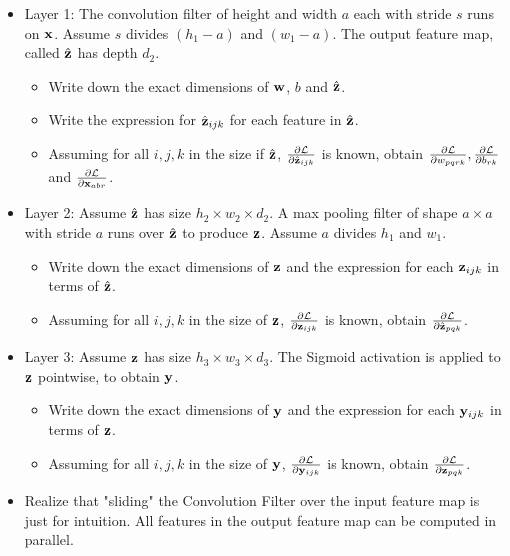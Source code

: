 \begin{itemize}
    \item 
Layer 1:
The convolution filter of height and width $a$ each with stride $s$ runs on $\mathbf{x}$. Assume $s$ divides $(h_1 - a)$ and $(w_1 - a)$. The output feature map, called $\hat{\mathbf{z}}$ has depth $d_2$. 
\begin{itemize}
    \item Write down the exact dimensions of $\mathbf{w}$, $b$ and $\hat{\mathbf{z}}$.
    \item Write the expression for $\hat{\mathbf{z}}_{ijk}$ for each feature in $\hat{\mathbf{z}}$. 
    \item Assuming for all $i,j,k$ in the size if $\hat{\mathbf{z}}$, $\frac{\partial \mathcal{L}}{\partial \hat{\mathbf{z}}_{ijk}}$ is known, obtain $\frac{\partial \mathcal{L}}{\partial w_{pqrk}}, \frac{\partial \mathcal{L}}{\partial b_{rk}}$ and $\frac{\partial \mathcal{L}}{\partial \mathbf{x}_{abr}}$.
\end{itemize}

\item 
Layer 2: Assume $\hat{\mathbf{z}}$ has size $h_2 \times w_2 \times d_2$. A max pooling filter of shape $a \times a$ with stride $a$ runs over $\hat{\mathbf{z}}$ to produce  $\mathbf{z}$. Assume $a$ divides $h_1$ and $w_1$. 
\begin{itemize}
    \item  Write down the exact dimensions of $\mathbf{z}$ and the expression for each $\mathbf{z}_{ijk}$ in terms of $\hat{\mathbf{z}}$.
    \item Assuming for all $i,j,k$ in the size of $\mathbf{z}$, $\frac{\partial \mathcal{L}}{\partial \mathbf{z}_{ijk}}$ is known, obtain $\frac{\partial \mathcal{L}}{\partial \hat{\mathbf{z}}_{pqk}}$.
\end{itemize}

\item Layer 3: Assume $\mathbf{z}$ has size $h_3 \times w_3 \times d_3$. The Sigmoid activation is applied to $\mathbf{z}$ pointwise, to obtain $\mathbf{y}$.
\begin{itemize}
    \item  Write down the exact dimensions of $\mathbf{y}$ and the expression for each $\mathbf{y}_{ijk}$ in terms of $\mathbf{z}$.
    \item Assuming for all $i,j,k$ in the size of $\mathbf{y}$, $\frac{\partial \mathcal{L}}{\partial \mathbf{y}_{ijk}}$ is known, obtain $\frac{\partial \mathcal{L}}{\partial \mathbf{z}_{pqk}}$.
\end{itemize}

\item Realize that "sliding" the Convolution Filter over the input feature map is just for intuition. All features in the output feature map can be computed in parallel.
\end{itemize}



